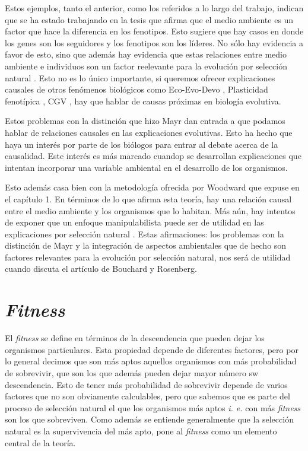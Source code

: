 Estos ejemplos, tanto el anterior, como los referidos a lo largo del trabajo, indican que se ha estado trabajando en la tesis que afirma que el medio ambiente es un factor que hace la diferencia en los fenotipos. Esto sugiere que hay casos en donde los genes son los seguidores y los fenotipos son los líderes. No sólo hay evidencia a favor de esto, sino que además hay evidencia que estas relaciones entre medio ambiente e individuos son un factor reelevante para la evolución por selección natural \cite{Jablonka2020, Dayan2020, MacColl2011}. Esto no es lo único importante, si queremos ofrecer explicaciones causales de otros fenómenos biológicos como Eco-Evo-Devo \cite{PfenningEco-Evo-Devo}, Plasticidad fenotípica \cite{WESTEBERHARD20082701}, CGV \cite{CVG}, hay que hablar de causas próximas en biología evolutiva.

Estos problemas con la distinción que hizo Mayr dan entrada a que podamos hablar de relaciones causales en las explicaciones evolutivas. Esto ha hecho que haya un interés por parte de los biólogos para entrar al debate acerca de la causalidad. Este interés es más marcado cuandop se desarrollan explicaciones que intentan incorporar una variable ambiental en el desarrollo de los organismos.

Esto además casa bien con la metodología ofrecida por Woodward que expuse en el capítulo 1. En términos de lo que afirma esta teoría, hay una relación causal entre el medio ambiente y los organismos que lo habitan. Más aún, hay intentos de exponer que un enfoque manipulabilista puede ser de utilidad en las explicaciones por selección natural \cite{MacColl2011}. Estas afirmaciones: los problemas con la distinción de Mayr y la integración de aspectos ambientales que de hecho son factores relevantes para la evolución por selección natural, nos será de utilidad cuando discuta el artículo de Bouchard y Rosenberg.


\section{\emph{Fitness}}

El \emph{fitness} se define en términos de la descendencia que pueden dejar los organismos particulares. Esta propiedad depende de diferentes factores, pero por lo general decimos que son más aptos aquellos organismos con más probabilidad de sobrevivir, que son los que además pueden dejar mayor número sw descendencia. Esto de tener más probabilidad de sobrevivir depende de varios factores que no son obviamente calculables, pero que sabemos que es parte del proceso de selección natural el que los organismos más aptos \emph{i. e.} con más \emph{fitness} son los que sobreviven. Como además se entiende generalmente que la selección natural es la supervivencia del más apto, pone al \emph{fitness} como un elemento central de la teoría.

